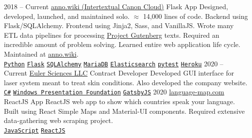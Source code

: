 \documentclass[9pt]{developercv} %
\begin{document}


\begin{entrylist}
	\entry
		{2018 -- Current}
        {{\href{https://github.com/malan88/icc}{anno.wiki (Intertextual Canon Cloud)}}}
		{Flask App}
        {Designed, developed, launched, and maintained solo. $\approx$ 14,000
        lines of code. Backend using Flask/SQLAlchemy. Frontend using Jinja2,
        Sass, and VanillaJS. Wrote many ETL data pipelines for processing
        {\href{https://gutenberg.org}{Project Gutenberg}} texts. Required an
        incredible amount of problem solving. Learned entire web application
        life cycle. Maintained at {\href{https://anno.wiki}{anno.wiki}}.
        \\
        \texttt{{\href{https://www.python.org/}{Python}}}\slashsep
        \texttt{{\href{https://flask.palletsprojects.com/en/1.1.x/}{Flask}}}\slashsep
        \texttt{{\href{https://www.sqlalchemy.org/}{SQLAlchemy}}}\slashsep
        \texttt{{\href{https://mariadb.org/}{MariaDB}}}\slashsep
        \texttt{{\href{https://www.elastic.co/}{Elasticsearch}}}\slashsep
        \texttt{{\href{https://docs.pytest.org/en/stable/}{pytest}}}\slashsep
        \texttt{{\href{https://www.heroku.com/}{Heroku}}}
        }
	\entry
		{2020 -- Current}
        {\href{https://euler-sci.com}{Euler Sciences LLC}}
		{Contract Developer}
        {Developed GUI interface for laser system meant to treat skin
        conditions. Also developed the company website.
        \\
        \texttt{{\href{https://en.wikipedia.org/wiki/C_Sharp_(programming_language)}{C\#}}}\slashsep
        \texttt{{\href{https://en.wikipedia.org/wiki/Windows_Presentation_Foundation}{Windows Presentation Foundation}}}\slashsep
        \texttt{{\href{https://www.gatsbyjs.org/}{GatsbyJS}}}
        }
    \entry
        {2020}
        {\href{https://language-map.com}{language-map.com}}
        {ReactJS App}
        {
            ReactJS web app to show which countries speak your language. Built
            using React Simple Maps and Material-UI components. Required
            extensive data-gathering web scraping project.
        \\
        \texttt{{\href{https://en.wikipedia.org/wiki/JavaScript}{JavaScript}}}\slashsep
        \texttt{{\href{https://reactjs.org/}{ReactJS}}}\slashsep
}
\end{entrylist}
\end{document}
